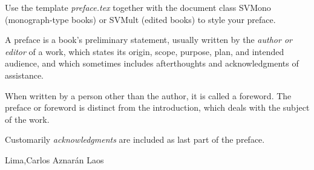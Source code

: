 %
%

\preface

Use the template \emph{preface.tex} together with the document class SVMono (monograph-type books) or SVMult (edited books) to style your preface.

A preface is a book's preliminary statement, usually written by the \textit{author or editor} of a work, which states its origin, scope, purpose, plan, and intended audience, and which sometimes includes afterthoughts and acknowledgments of assistance.

When written by a person other than the author, it is called a foreword. The preface or foreword is distinct from the introduction, which deals with the subject of the work.

Customarily \textit{acknowledgments} are included as last part of the preface.


\vspace{\baselineskip}
\begin{flushright}\noindent
    Lima,\hfill Carlos Aznarán Laos
\end{flushright}


